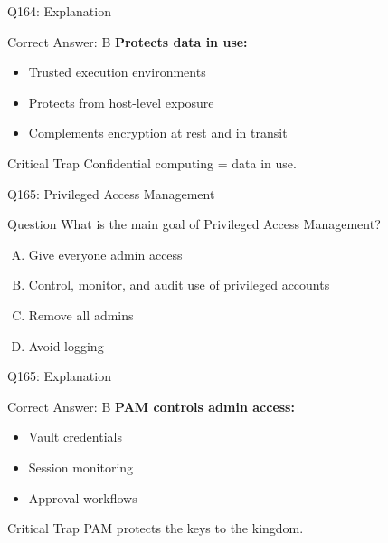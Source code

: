 \documentclass{beamer}
\begin{document}
	\begin{frame}{Q164: Explanation}
		\begin{block}{Correct Answer: B}
			\textbf{Protects data in use:}
			\begin{itemize}
				\item Trusted execution environments
				\item Protects from host-level exposure
				\item Complements encryption at rest and in transit
			\end{itemize}
		\end{block}
		\begin{alertblock}{Critical Trap}
			Confidential computing = data in use.
		\end{alertblock}
	\end{frame}
	
	\begin{frame}{Q165: Privileged Access Management}
		\begin{block}{Question}
			What is the main goal of Privileged Access Management?
		\end{block}
		\begin{enumerate}[(A)]
			\item Give everyone admin access
			\item Control, monitor, and audit use of privileged accounts
			\item Remove all admins
			\item Avoid logging
		\end{enumerate}
	\end{frame}
	
	\begin{frame}{Q165: Explanation}
		\begin{block}{Correct Answer: B}
			\textbf{PAM controls admin access:}
			\begin{itemize}
				\item Vault credentials
				\item Session monitoring
				\item Approval workflows
			\end{itemize}
		\end{block}
		\begin{alertblock}{Critical Trap}
			PAM protects the keys to the kingdom.
		\end{alertblock}
	\end{frame}
	
\end{document}
